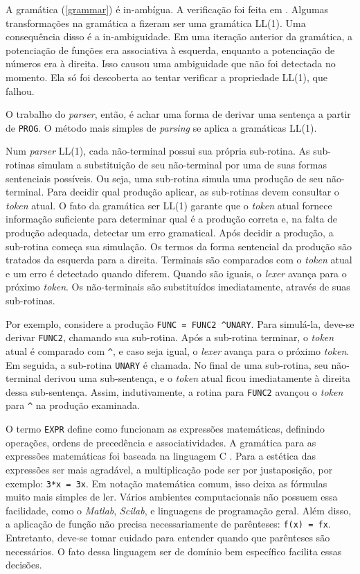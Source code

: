 A gramática (\ref{grammar}) é in-ambígua.
A verificação foi feita em \cite{GramCheck}.
Algumas transformações na gramática a fizeram ser uma gramática LL(1).
Uma consequência disso é a in-ambiguidade.
Em uma iteração anterior da gramática, a potenciação de funções
era associativa à esquerda,
enquanto a potenciação de números era à direita.
Isso causou uma ambiguidade que não foi detectada no momento.
Ela só foi descoberta ao tentar verificar a propriedade LL(1), que falhou.

O trabalho do \textit{parser}, então, é achar uma forma de derivar uma
sentença a partir de \texttt{PROG}.
O método mais simples de \textit{parsing} se aplica a gramáticas LL(1).

Num \textit{parser} LL(1), cada não-terminal possui sua própria sub-rotina.
As sub-rotinas simulam a substituição de seu não-terminal
por uma de suas formas sentenciais possíveis.
Ou seja, uma sub-rotina simula uma produção de seu não-terminal.
Para decidir qual produção aplicar, as sub-rotinas devem consultar o \textit{token} atual.
O fato da gramática ser LL(1) garante que o \textit{token} atual fornece
informação suficiente para determinar qual é a produção correta e,
na falta de produção adequada,
detectar um erro gramatical. Após decidir a produção,
a sub-rotina começa sua simulação.
Os termos da forma sentencial da produção são tratados da esquerda para a direita.
Terminais são comparados com o \textit{token} atual e um erro é detectado quando diferem.
Quando são iguais, o \textit{lexer} avança para o próximo \textit{token}.
Os não-terminais são substituídos imediatamente, através de suas sub-rotinas.

Por exemplo, considere a produção \texttt{FUNC = FUNC2 \textasciicircum UNARY}.
Para simulá-la, deve-se derivar \texttt{FUNC2}, chamando sua sub-rotina.
Após a sub-rotina terminar, o \textit{token} atual é comparado com \texttt{\textasciicircum},
e caso seja igual, o \textit{lexer} avança para o próximo \textit{token}.
Em seguida, a sub-rotina \texttt{UNARY} é chamada.
No final de uma sub-rotina, seu não-terminal derivou uma sub-sentença,
e o \textit{token} atual ficou imediatamente à direita dessa sub-sentença.
Assim, indutivamente, a rotina para \texttt{FUNC2} avançou
o \textit{token} para \texttt{\textasciicircum} na produção examinada.

O termo \texttt{EXPR} define como funcionam as expressões matemáticas,
definindo operações, ordens de precedência e associatividades.
A gramática para as expressões matemáticas foi baseada na linguagem C \cite{CGram}.
Para a estética das expressões ser mais agradável, a multiplicação pode ser
por justaposição, por exemplo: \texttt{3*x = 3x}.
Em notação matemática comum, isso deixa as fórmulas muito mais simples de ler.
Vários ambientes computacionais não possuem essa facilidade,
como o \textit{Matlab}, \textit{Scilab}, e linguagens de programação geral.
Além disso, a aplicação de função não precisa
necessariamente de parênteses: \texttt{f(x) = fx}.
Entretanto, deve-se tomar cuidado para entender
quando que parênteses são necessários.
O fato dessa linguagem ser de domínio bem específico facilita essas decisões.

